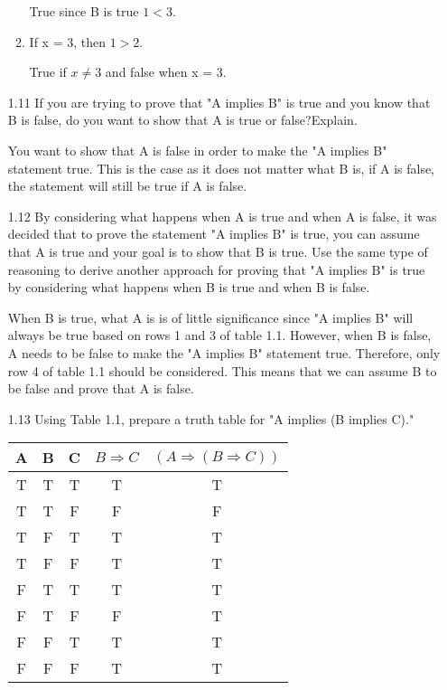 \documentclass[11pt]{article}
\begin{document}
\begin{enumerate}
\begin{enumerate}
   True since B is true $1 < 3$.
   \item If x = 3, then $1 > 2$.\par  
   True if $x \neq 3$ and false when x = 3.
   \end{enumerate}
   \item[1.11]If you are trying to prove that "A implies B" is true and you know that B is false, do you want to show that A is true or false?Explain.\par 
   \hspace{3em} You want to show that A is false in order to make the "A implies B" statement true. This is the case as it does not matter what B is, if A is false, the statement will still be true if A is false.
   \item[1.12]By considering what happens when A is true and when A is false, it was decided that to prove the statement "A implies B" is true, you can assume that A is true and your goal is to show that B is true. Use the same type of reasoning to derive another approach for proving that "A implies B" is true by considering what happens when B is true and when B is false.\par 
   \hspace{3em}When B is true, what A is is of little significance since "A implies B" will always be true based on rows 1 and 3 of table 1.1. However, when B is false, A needs to be false to make the "A implies B" statement true. Therefore, only row 4 of table 1.1 should be considered. This means that we can assume B to be false and prove that A is false.
   \item[1.13]Using Table 1.1, prepare a truth table for "A implies (B implies C)."\par 
   \begin{table}[H]
   \def\arraystretch{1.5}
   \begin{tabular}{|c|c|c|c|c|}
    \hline
    A & B & C &$B \Rightarrow C$&$\left(A \Rightarrow \left(B \Rightarrow C \right)\right)$\\\hline
    T & T & T & T & T\\\hline
    T & T & F & F & F\\\hline
    T & F & T & T & T\\\hline
    T & F & F & T & T\\\hline
    F & T & T & T & T\\\hline
    F & T & F & F & T\\\hline
    F & F & T & T & T\\\hline
    F & F & F & T & T\\\hline

\end{tabular}
\end{table}
\end{enumerate}
\end{document}
